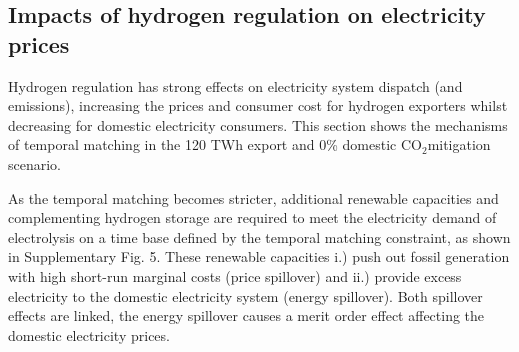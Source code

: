\documentclass[5p,numafflabel]{elsarticle}
\newcommand{\co}{\ce{CO2}~}
\def\co{CO${}_2${\:}}
\begin{document}





\subsection*{Impacts of hydrogen regulation on electricity prices}
\label{subsec:benefits_rule}

Hydrogen regulation has strong effects on electricity system dispatch (and emissions), increasing the prices and consumer cost for hydrogen exporters whilst decreasing for domestic electricity consumers. This section shows the mechanisms of temporal matching in the 120 TWh export and 0\% domestic \co mitigation scenario.

As the temporal matching becomes stricter, additional renewable capacities and complementing hydrogen storage are required to meet the electricity demand of electrolysis
on a time base defined by the temporal matching constraint, as shown in Supplementary Fig. 5. %
These renewable capacities i.) push out fossil generation with high short-run marginal costs (price spillover) and ii.) provide excess electricity to the domestic electricity system (energy spillover). Both spillover effects are linked, the energy spillover causes a merit order effect affecting the domestic electricity prices.
\end{document}
